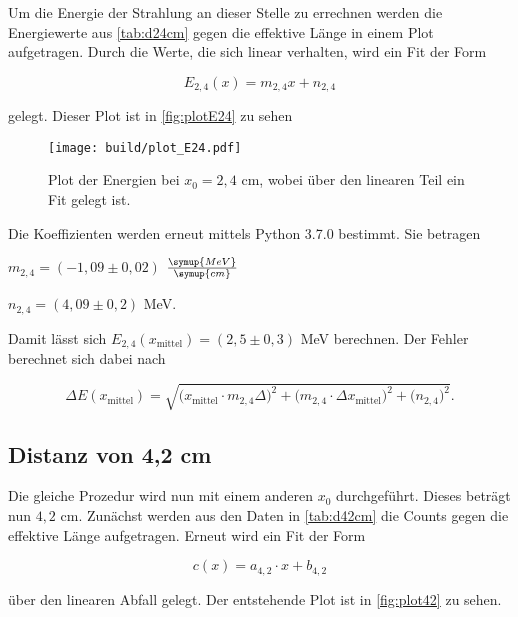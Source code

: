 Um die Energie der Strahlung an dieser Stelle zu errechnen werden die Energiewerte aus \autoref{tab:d24cm} gegen die effektive Länge in einem Plot aufgetragen.
Durch die Werte, die sich linear verhalten, wird ein Fit der Form

\begin{equation}
    E_{2,4}(x) = m_{2,4} x + n_{2,4}
\end{equation}

gelegt. Dieser Plot ist in \autoref{fig:plotE24} zu sehen

\begin{figure}
    \centering
    \texttt{[image: build/plot\_E24.pdf]}
    \caption{Plot der Energien bei $x_0 = 2,4$ cm, wobei über den linearen Teil ein Fit gelegt ist.}
    \label{fig:plotE24}
\end{figure}

Die Koeffizienten werden erneut mittels Python 3.7.0 bestimmt. Sie betragen

\begin{center}
    $m_{2,4} = (-1,09 \pm 0,02)$ $\frac{\symup{MeV}}{\symup{cm}}$

    $n_{2,4} = (4,09 \pm 0,2)$ MeV.
\end{center}

Damit lässt sich $E_{2,4}(x_\text{mittel}) = (2,5 \pm 0,3)$ MeV berechnen. Der Fehler berechnet sich dabei nach

\begin{equation}
    \Delta E(x_\text{mittel}) = \sqrt{\bigg( x_\text{mittel} \cdot m_{2,4} \Delta \bigg)^2 + \bigg(m_{2,4} \cdot \Delta x_\text{mittel} \bigg)^2 + \bigg( n_{2,4} \bigg)^2}.
\end{equation}



\subsection{Distanz von 4,2 cm}

Die gleiche Prozedur wird nun mit einem anderen $x_0$ durchgeführt. Dieses beträgt nun $4,2$ cm.
Zunächst werden aus den Daten in \autoref{tab:d42cm} die Counts gegen die effektive Länge aufgetragen. Erneut wird ein Fit der Form

\begin{equation}
    c(x) = a_{4,2} \cdot x + b_{4,2}
\end{equation}

über den linearen Abfall gelegt. Der entstehende Plot ist in \autoref{fig:plot42} zu sehen.

